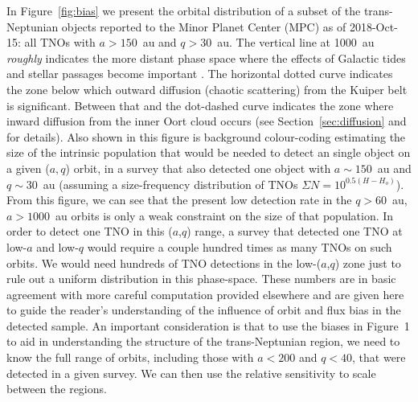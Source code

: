 \documentclass[preprint]{aastex62}
\begin{document}
In Figure~\ref{fig:bias} we present the orbital distribution of a subset of the trans-Neptunian objects reported to the Minor Planet Center (MPC) as of 2018-Oct-15: all TNOs with $a > 150$~au and $q > 30$~au.  The vertical line at 1000~au {\em roughly} indicates the more distant phase space where the effects of Galactic tides and stellar passages become important \citep[e.g.][]{kaib09}. The horizontal dotted curve indicates the zone below which outward diffusion (chaotic scattering) from the Kuiper belt is significant. Between that and the dot-dashed curve indicates the zone where inward diffusion from the inner Oort cloud occurs (see Section~\ref{sec:diffusion} and \citealt{bannister17} for details).  Also shown in this figure is background colour-coding estimating the size of the intrinsic population that would be needed to detect an single object on a given ($a,q$) orbit, in a survey that also detected one object with $a \sim 150$~au and $q \sim 30$~au (assuming a size-frequency distribution of TNOs $ \Sigma{N} = 10^{0.5(H-H_o)}$).  From this figure, we can see that the present low detection rate in the $q>60$~au, $a > 1000$~au orbits is only a weak constraint on the size of that population. In order to detect one TNO in this ($a$,$q$) range, a survey that detected one TNO at low-$a$ and low-$q$ would require a couple hundred times as many TNOs on such orbits.
We would need hundreds of TNO detections in the low-($a$,$q$) zone just to rule out a uniform distribution in this phase-space.  
These numbers are in basic agreement with more careful computation provided elsewhere \citep[e.g.][]{sheppard18} and are given here to guide the reader's understanding of the influence of orbit and flux bias in the detected sample.
An important consideration is that to use the biases in Figure~1 to aid in understanding the structure of the trans-Neptunian region, we need to know the full range of orbits, including those with $a< 200$ and $q<40$, that were detected in a given survey. We can then use the relative sensitivity to scale between the regions. 
\end{document}
